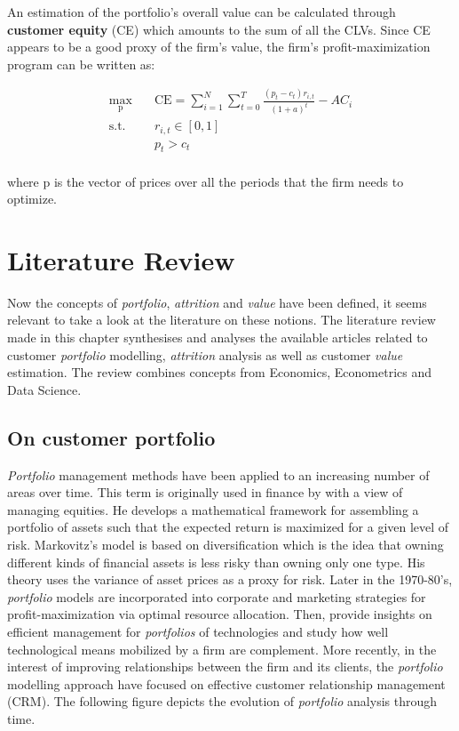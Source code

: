 \documentclass[
]{book}
\begin{document}
An estimation of the portfolio's overall value can be calculated through \textbf{customer equity} (CE) which amounts to the sum of all the CLVs. Since CE appears to be a good proxy of the firm's value, the firm's profit-maximization program can be written as:

\begin{equation}
\begin{aligned}
\max_{\mathrm{p}} \quad & \textrm{CE} = \sum_{i=1}^{N} \sum_{t=0}^{T} \frac{(p_t - c_t)r_{i,t}}{(1+a)^t} - AC_i\\
\textrm{s.t.} \quad & r_{i,t} \in [0, 1]\\
  &p_t > c_t    \\
\end{aligned}
\label{eq:maxprofit}
\end{equation}

where \(\mathrm{p}\) is the vector of prices over all the periods that the firm needs to optimize.

\hypertarget{literature}{%
\chapter{Literature Review}\label{literature}}

Now the concepts of \emph{portfolio}, \emph{attrition} and \emph{value} have been defined, it seems relevant to take a look at the literature on these notions. The literature review made in this chapter synthesises and analyses the available articles related to customer \emph{portfolio} modelling, \emph{attrition} analysis as well as customer \emph{value} estimation. The review combines concepts from Economics, Econometrics and Data Science.

\hypertarget{portfolio}{%
\section{On customer portfolio}\label{portfolio}}

\emph{Portfolio} management methods have been applied to an increasing number of areas over time. This term is originally used in finance by \citet{MARKOWITZ} with a view of managing equities. He develops a mathematical framework for assembling a portfolio of assets such that the expected return is maximized for a given level of risk. Markovitz's model is based on diversification which is the idea that owning different kinds of financial assets is less risky than owning only one type. His theory uses the variance of asset prices as a proxy for risk. Later in the 1970-80's, \emph{portfolio} models are incorporated into corporate \citep{WIND} and marketing \citep{DAY} strategies for profit-maximization via optimal resource allocation. Then, \citet{CAPON} provide insights on efficient management for \emph{portfolios} of technologies and study how well technological means mobilized by a firm are complement. More recently, in the interest of improving relationships between the firm and its clients, the \emph{portfolio} modelling approach have focused on effective customer relationship management (CRM). The following figure depicts the evolution of \emph{portfolio} analysis through time.
\end{document}
